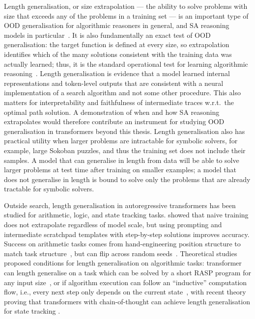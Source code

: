 Length generalisation, or size extrapolation --- the ability to solve problems with size that exceeds any of the problems in a training set --- is an important type of OOD generalisation for algorithmic reasoners in general, and SA reasoning models in particular~\citep{anilExploringLengthGeneralization,velickovicCLRSAlgorithmicReasoning2022}.
It is also fundamentally an exact test of OOD generalisation: the target function is defined at every size, so extrapolation identifies which of the many solutions consistent with the training data was actually learned; thus, it is the standard operational test for learning algorithmic reasoning~\citep{zhouWhatAlgorithmsCan2023,anilExploringLengthGeneralization}.
Length generalisation is evidence that a model learned internal representations and token-level outputs that are consistent with a neural implementation of a search algorithm and not some other procedure.
This also matters for interpretability and faithfulness of intermediate traces w.r.t.\ the optimal path solution.
A demonstration of when and how SA reasoning extrapolates would therefore contribute an instrument for studying OOD generalisation in transformers beyond this thesis.
Length generalisation also has practical utility when larger problems are intractable for symbolic solvers, for example, large Sokoban puzzles, and thus the training set does not include their samples.
A model that can generalise in length from data will be able to solve larger problems at test time after training on smaller examples; a model that does not generalise in length is bound to solve only the problems that are already tractable for symbolic solvers.

Outside search, length generalisation in autoregressive transformers has been studied for arithmetic, logic, and state tracking tasks.
\citet{anilExploringLengthGeneralization} showed that naive training does not extrapolate regardless of model scale, but using prompting and intermediate scratchpad templates with step-by-step solutions improves accuracy.
Success on arithmetic tasks comes from hand-engineering position structure to match task structure~\citep{kazemnejadNoPE2023,mcleishAbacus2024,choPositionCoupling2024}, but can flip across random seeds~\citep{zhouTransformersCanAchieve2024}.
Theoretical studies proposed conditions for length generalisation on algorithmic tasks: transformer can length generalise on a task which can be solved by a short RASP program for any input size~\citep{zhouWhatAlgorithmsCan2023}, or if algorithm execution can follow an ``inductive'' computation flow, i.e., every next step only depends on the current state~\citep{houUniversalLengthGeneralization2024,abbeHowFarCan2024}, with recent theory proving that transformers with chain-of-thought can achieve length generalisation for state tracking \citep{huangTransformersProvablyLearn2025}.

